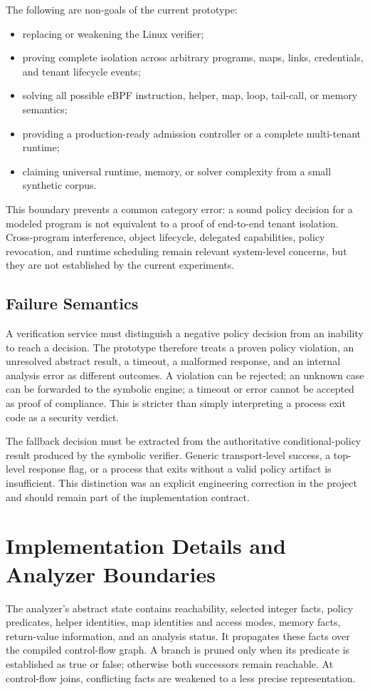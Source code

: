 The following are non-goals of the current prototype:
\begin{itemize}
  \item replacing or weakening the Linux verifier;
  \item proving complete isolation across arbitrary programs, maps, links, credentials, and tenant lifecycle events;
  \item solving all possible eBPF instruction, helper, map, loop, tail-call, or memory semantics;
  \item providing a production-ready admission controller or a complete multi-tenant runtime;
  \item claiming universal runtime, memory, or solver complexity from a small synthetic corpus.
\end{itemize}

This boundary prevents a common category error: a sound policy decision for a modeled program is not equivalent to a proof of end-to-end tenant isolation. Cross-program interference, object lifecycle, delegated capabilities, policy revocation, and runtime scheduling remain relevant system-level concerns, but they are not established by the current experiments.

\subsection{Failure Semantics}
A verification service must distinguish a negative policy decision from an inability to reach a decision. The prototype therefore treats a proven policy violation, an unresolved abstract result, a timeout, a malformed response, and an internal analysis error as different outcomes. A violation can be rejected; an unknown case can be forwarded to the symbolic engine; a timeout or error cannot be accepted as proof of compliance. This is stricter than simply interpreting a process exit code as a security verdict.

The fallback decision must be extracted from the authoritative conditional-policy result produced by the symbolic verifier. Generic transport-level success, a top-level response flag, or a process that exits without a valid policy artifact is insufficient. This distinction was an explicit engineering correction in the project and should remain part of the implementation contract.

\section{Implementation Details and Analyzer Boundaries}
The analyzer's abstract state contains reachability, selected integer facts, policy predicates, helper identities, map identities and access modes, memory facts, return-value information, and an analysis status. It propagates these facts over the compiled control-flow graph. A branch is pruned only when its predicate is established as true or false; otherwise both successors remain reachable. At control-flow joins, conflicting facts are weakened to a less precise representation.

